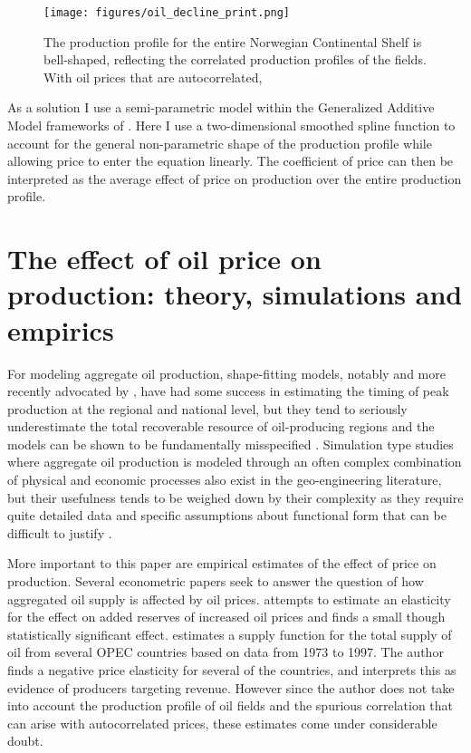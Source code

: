 \documentclass[12pt]{article}
\begin{document}
\begin{figure}
	\texttt{[image: figures/oil\_decline\_print.png]}
	\caption{The production profile for the entire Norwegian Continental Shelf is bell-shaped, reflecting the correlated production profiles of the fields.  With oil prices that are autocorrelated, }
	\label{oil_decline}
\end{figure}

As a solution I use a semi-parametric model within the Generalized Additive Model frameworks of \cite{hastie_generalized_1990}.  Here I use a two-dimensional smoothed spline function to account for the general non-parametric shape of the production profile while allowing price to enter the equation linearly.  The coefficient of price can then be interpreted as the average effect of price on production over the entire production profile.

\FloatBarrier
\section{The effect of oil price on production: theory, simulations and empirics}

For modeling aggregate oil production, shape-fitting models, notably \citet{hubbert_energy_1962} and more recently advocated by \citet{deffeyes_hubberts_2001}, have had some success in estimating the timing of peak production at the regional and national level, but they tend to seriously underestimate the total recoverable resource of oil-producing regions and the models can be shown to be fundamentally misspecified \citep{boyce_prediction_2013}.   Simulation type studies where aggregate oil production is modeled through an often complex combination of physical and economic processes also exist in the geo-engineering literature, but their usefulness tends to be weighed down by their complexity as they require quite detailed data and specific assumptions about functional form that can be difficult to justify \citet{brandt_review_2010}.

More important to this paper are empirical estimates of the effect of price on production. Several econometric papers seek to answer the question of how aggregated oil supply is affected by oil prices.  \citet{farzin_impact_2001} attempts to estimate an elasticity for the effect on added reserves of increased oil prices and finds a small though statistically significant effect.  \citet{ramcharran_oil_2002} estimates a supply function for the total supply of oil from several OPEC countries based on data from 1973 to 1997.  The author finds a negative price elasticity for several of the countries, and interprets this as evidence of producers targeting revenue.  However since the author does not take into account the production profile of oil fields and the spurious correlation that can arise with autocorrelated prices, these estimates come under considerable doubt.  
\end{document}
